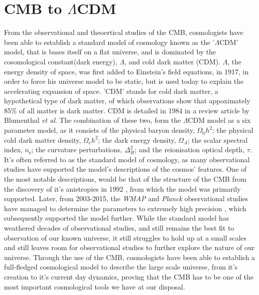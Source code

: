 \documentclass[twocolumn, prl, nobalancelastpage, aps, citeautoscript, longbibliography, 10pt]{revtex4-1}
\begin{document}
\section{CMB to $\Lambda$CDM}
From the observational and theoertical studies of the CMB, cosmologists have been able to establish a standard model of cosmology
known as the '$\Lambda$CDM' model, that is bases itself on a flat universe, and is dominated by the cosomological constant(dark energy), $\Lambda$, and 
cold dark matter (CDM). 
$\Lambda$, the energy density of space, was first added to Einstein's field equations, in 1917, in order to force his universe model to be static, but is used today
to explain the accelerating expansion of space.
'CDM' stands for cold dark matter, a hypothetical type of dark matter, of which observations show that appoximately 85$\%$ of all matter is dark matter.
CDM is detailed in 1984 in a review article by Blumenthal \textit{et al}\cite{CDM}. 
The combination of these two, form the $\Lambda$CDM model as a six parameter model, as it consists of \cite{WMAP 2013} the physical baryon density, $\Omega_{\text{b}}h^2$; 
the physical cold dark matter density, $\Omega_{\text{c}}h^2$; the dark energy density, $\Omega_\Lambda$;
the scalar spectral index, $n_\text{s}$; the curvature perturbations, $\Delta^2_R$; and the reionisation optical 
depth, $\tau$. It's often referred to as the standard model of cosmology, \cite{Planck XIII} as many observational studies have supported the model's 
descriptions of the cosmos' features. One of the most notable descriptions, would be that of the structure of the CMB from the discovery of it's anistropies in 1992 \cite{Smoot}, 
from which the model was primarily supported.
Later, from 2003-2015, the \textit{WMAP} and \textit{Planck} observational studies have managed to determine the parameters to extremely high precision \cite{Planck XVI}, which
subsequently supported the model further. While the standard model has weathered decades of observational studies, and still remains the best fit to observation of our 
known universe, it still struggles to hold up at a 
small scales and still leaves room for observational studies to further explore the nature of our universe. Through the use of the CMB, cosmologists have been able to establish a 
full-fledged cosmological model to describe the large scale universe, from it's creation to it's current day dynamics, proving that the CMB has to be one of the most 
important cosmological tools we have at our disposal.
\end{document}
